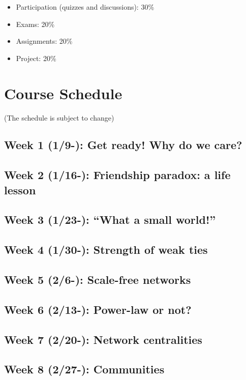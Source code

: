 \documentclass[11pt,article,oneside]{memoir}
\begin{document}
\begin{itemize}

\item Participation (quizzes and discussions): 30\%

\item Exams: 20\%

\item Assignments: 20\%

\item Project: 20\%


\end{itemize}

\section{Course Schedule}

(The schedule is subject to change)

\subsection{Week 1 (1/9-):  Get ready! Why do we care?}
\subsection{Week 2 (1/16-):  Friendship paradox: a life lesson}
\subsection{Week 3 (1/23-):  ``What a small world!''}
\subsection{Week 4 (1/30-):  Strength of weak ties} %
\subsection{Week 5 (2/6-):  Scale-free networks} %
\subsection{Week 6 (2/13-):  Power-law or not?}
\subsection{Week 7 (2/20-):  Network centralities} 
\subsection{Week 8 (2/27-):  Communities}
\end{document}
